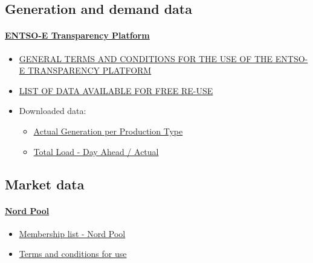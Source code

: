 \hypertarget{generation-and-demand-data}{%
\subsection{Generation and demand
data}\label{generation-and-demand-data}}

\hypertarget{entso-e-transparency-platform}{%
\paragraph{\texorpdfstring{\href{https://transparency.entsoe.eu/}{ENTSO-E
Transparency
Platform}}{ENTSO-E Transparency Platform}}\label{entso-e-transparency-platform}}

\begin{itemize}
\tightlist
\item
  \href{https://docstore.entsoe.eu/Documents/MC\%20documents/Transparency\%20Platform/ENTSOE_Transparency_Terms_Conditions.pdf}{GENERAL
  TERMS AND CONDITIONS FOR THE USE OF THE ENTSO-E TRANSPARENCY PLATFORM}
\item
  \href{https://docstore.entsoe.eu/Documents/MC\%20documents/Transparency\%20Platform/List_of_Data_available_for_reuse.pdf}{LIST
  OF DATA AVAILABLE FOR FREE RE-USE}
\item
  Downloaded data:

  \begin{itemize}
  \tightlist
  \item
    \href{https://transparency.entsoe.eu/generation/r2/actualGenerationPerProductionType/show}{Actual
    Generation per Production Type}
  \item
    \href{https://transparency.entsoe.eu/load-domain/r2/totalLoadR2/show}{Total
    Load - Day Ahead / Actual}
  \end{itemize}
\end{itemize}

\hypertarget{market-data}{%
\subsection{Market data}\label{market-data}}

\hypertarget{nord-pool}{%
\paragraph{\texorpdfstring{\href{https://www.nordpoolgroup.com/historical-market-data/}{Nord
Pool}}{Nord Pool}}\label{nord-pool}}

\begin{itemize}
\tightlist
\item
  \href{https://www.nordpoolgroup.com/trading/join-our-markets/membership/}{Membership
  list - Nord Pool}
\item
  \href{https://www.nordpoolgroup.com/About-us/Terms-and-conditions-for-use/}{Terms
  and conditions for use}
\end{itemize}

